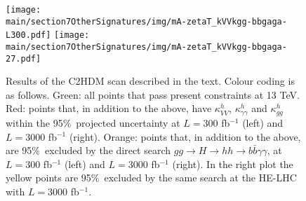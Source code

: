 %
\begin{figure}
\centering
{\texttt{[image: \\main/section7OtherSignatures/img/mA-zetaT\_kVVkgg-bbgaga-L300.pdf]}} \quad
{\texttt{[image: \\main/section7OtherSignatures/img/mA-zetaT\_kVVkgg-bbgaga-27.pdf]}}
\caption{Results of the C2HDM scan described in the text. Colour coding is as follows.
Green: all points that pass present constraints at 13 TeV. 
Red: points that, in addition to the above, have $\kappa_{VV}^h$, $\kappa_{\gamma\gamma}^h$ and $\kappa_{gg}^h$ within the 95\%~\cl projected uncertainty at $L=300$ fb$^{-1}$ (left) and $L=3000$ fb$^{-1}$ (right).
Orange: points that, in addition to the above,  are 95\%~\cl excluded  by the direct search $gg\to H\to hh\to b\bar b\gamma\gamma$, at $L=300$ fb$^{-1}$ (left) and $L=3000$ fb$^{-1}$ (right). In the right plot the yellow points are 95\%~\cl excluded by the same search  at the HE-LHC with $L=3000$ fb$^{-1}$.
\label{fig:bbgaga}}
\end{figure}

